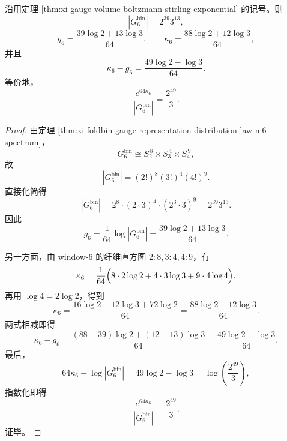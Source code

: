 \begin{theorem}\label{thm:derived-window6-gauge-volume-defect-identity}
沿用定理 \ref{thm:xi-gauge-volume-boltzmann-stirling-exponential} 的记号。则
\[
|G_6^{\mathrm{bin}}|=2^{39}3^{13},
\]
\[
g_6=\frac{39\log 2+13\log 3}{64},
\qquad
\kappa_6=\frac{88\log 2+12\log 3}{64},
\]
并且
\[
\kappa_6-g_6=\frac{49\log 2-\log 3}{64}.
\]
等价地，
\[
\frac{e^{64\kappa_6}}{|G_6^{\mathrm{bin}}|}=\frac{2^{49}}{3}.
\]
\end{theorem}
\begin{proof}
由定理 \ref{thm:xi-foldbin-gauge-representation-distribution-law-m6-spectrum}，
\[
G_6^{\mathrm{bin}}\cong S_2^{\,8}\times S_3^{\,4}\times S_4^{\,9},
\]
故
\[
|G_6^{\mathrm{bin}}|=(2!)^8(3!)^4(4!)^9.
\]
直接化简得
\[
|G_6^{\mathrm{bin}}|
=
2^8\cdot (2\cdot 3)^4\cdot (2^3\cdot 3)^9
=
2^{39}3^{13}.
\]
因此
\[
g_6=\frac1{64}\log |G_6^{\mathrm{bin}}|
=
\frac{39\log 2+13\log 3}{64}.
\]

另一方面，由 window-\(6\) 的纤维直方图 \(2:8,3:4,4:9\)，有
\[
\kappa_6
=
\frac1{64}\Bigl(8\cdot 2\log 2+4\cdot 3\log 3+9\cdot 4\log 4\Bigr).
\]
再用 \(\log 4=2\log 2\)，得到
\[
\kappa_6
=
\frac{16\log 2+12\log 3+72\log 2}{64}
=
\frac{88\log 2+12\log 3}{64}.
\]
两式相减即得
\[
\kappa_6-g_6
=
\frac{(88-39)\log 2+(12-13)\log 3}{64}
=
\frac{49\log 2-\log 3}{64}.
\]
最后，
\[
64\kappa_6-\log |G_6^{\mathrm{bin}}|
=
49\log 2-\log 3
=
\log\!\left(\frac{2^{49}}{3}\right),
\]
指数化即得
\[
\frac{e^{64\kappa_6}}{|G_6^{\mathrm{bin}}|}=\frac{2^{49}}{3}.
\]
证毕。
\end{proof}

